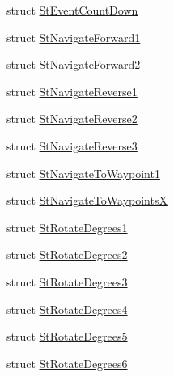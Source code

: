 \begin{DoxyCompactItemize}
struct \hyperlink{structsm__ridgeback__floor__coverage__static__1_1_1StEventCountDown}{St\+Event\+Count\+Down}
\item 
struct \hyperlink{structsm__ridgeback__floor__coverage__static__1_1_1StNavigateForward1}{St\+Navigate\+Forward1}
\item 
struct \hyperlink{structsm__ridgeback__floor__coverage__static__1_1_1StNavigateForward2}{St\+Navigate\+Forward2}
\item 
struct \hyperlink{structsm__ridgeback__floor__coverage__static__1_1_1StNavigateReverse1}{St\+Navigate\+Reverse1}
\item 
struct \hyperlink{structsm__ridgeback__floor__coverage__static__1_1_1StNavigateReverse2}{St\+Navigate\+Reverse2}
\item 
struct \hyperlink{structsm__ridgeback__floor__coverage__static__1_1_1StNavigateReverse3}{St\+Navigate\+Reverse3}
\item 
struct \hyperlink{structsm__ridgeback__floor__coverage__static__1_1_1StNavigateToWaypoint1}{St\+Navigate\+To\+Waypoint1}
\item 
struct \hyperlink{structsm__ridgeback__floor__coverage__static__1_1_1StNavigateToWaypointsX}{St\+Navigate\+To\+WaypointsX}
\item 
struct \hyperlink{structsm__ridgeback__floor__coverage__static__1_1_1StRotateDegrees1}{St\+Rotate\+Degrees1}
\item 
struct \hyperlink{structsm__ridgeback__floor__coverage__static__1_1_1StRotateDegrees2}{St\+Rotate\+Degrees2}
\item 
struct \hyperlink{structsm__ridgeback__floor__coverage__static__1_1_1StRotateDegrees3}{St\+Rotate\+Degrees3}
\item 
struct \hyperlink{structsm__ridgeback__floor__coverage__static__1_1_1StRotateDegrees4}{St\+Rotate\+Degrees4}
\item 
struct \hyperlink{structsm__ridgeback__floor__coverage__static__1_1_1StRotateDegrees5}{St\+Rotate\+Degrees5}
\item 
struct \hyperlink{structsm__ridgeback__floor__coverage__static__1_1_1StRotateDegrees6}{St\+Rotate\+Degrees6}
\end{DoxyCompactItemize}
